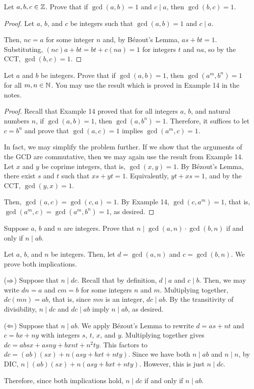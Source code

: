 \begin{recommended}
  Let $a,b,c\in\mathbb{Z}$. Prove that if $\gcd(a, b) = 1$ and $c \mid a$, then $\gcd(b, c) = 1$.
\end{recommended}
\begin{proof}
  Let $a$, $b$, and $c$ be integers such that $\gcd(a,b)=1$ and $c \mid a$.

  Then, $nc = a$ for some integer $n$ and, by Bézout's Lemma, $as+bt=1$.
  Substituting, $(nc)a+bt=bt+c(na)=1$ for integers $t$ and $na$, so by the CCT, $\gcd(b,c)=1$.
\end{proof}


\begin{recommended}
  Let $a$ and $b$ be integers.
  Prove that if $\gcd(a, b) = 1$, then $\gcd(a^m, b^n) = 1$ for all $m,n\in\mathbb{N}$.
  You may use the result which is proved in Example 14 in the notes.
\end{recommended}
\begin{proof}
  Recall that Example 14 proved that for all integers $a$, $b$, and natural numbers $n$,
  if $\gcd(a, b)=1$, then $\gcd(a, b^n)=1$.
  Therefore, it suffices to let $c=b^n$ and prove that $\gcd(a, c)=1$ implies $\gcd(a^m, c)=1$.

  In fact, we may simplify the problem further.
  If we show that the arguments of the GCD are commutative,
  then we may again use the result from Example 14.
  Let $x$ and $y$ be coprime integers, that is, $\gcd(x,y)=1$.
  By Bézout's Lemma, there exist $s$ and $t$ such that $xs+yt=1$.
  Equivalently, $yt+xs=1$, and by the CCT, $\gcd(y,x)=1$.

  Then, $\gcd(a,c)=\gcd(c,a)=1$.
  By Example 14, $\gcd(c,a^m)=1$, that is, $\gcd(a^m,c)=\gcd(a^m,b^n)=1$, as desired.
\end{proof}


\begin{recommended}
  Suppose $a$, $b$ and $n$ are integers.
  Prove that $n \mid \gcd(a, n) \cdot \gcd(b, n)$ if and only if $n \mid ab$.
\end{recommended}
\begin{prf}
  Let $a$, $b$, and $n$ be integers.
  Then, let $d=\gcd(a,n)$ and $c=\gcd(b,n)$.
  We prove both implications.

  ($\Rightarrow$) Suppose that $n \mid dc$.
  Recall that by definition, $d \mid a$ and $c \mid b$.
  Then, we may write $dn=a$ and $cm=b$ for some integers $n$ and $m$.
  Multiplying together, $dc(mn)=ab$, that is, since $mn$ is an integer, $dc \mid ab$.
  By the transitivity of divisibility, $n \mid dc$ and $dc \mid ab$ imply $n \mid ab$, as desired.

  ($\Leftarrow$) Suppose that $n \mid ab$.
  We apply Bézout's Lemma to rewrite $d=as+nt$ and $c=bx+ny$ with integers $s$, $t$, $x$, and $y$.
  Multiplying together gives $dc = absx+asny+bxnt+n^2ty$.
  This factors to $dc = (ab)(sx)+n(asy+bxt+nty)$.
  Since we have both $n \mid ab$ and $n \mid n$, by DIC, $n \mid (ab)(sx)+n(asy+bxt+nty)$.
  However, this is just $n \mid dc$.

  Therefore, since both implications hold, $n \mid dc$ if and only if $n \mid ab$.
\end{prf}


